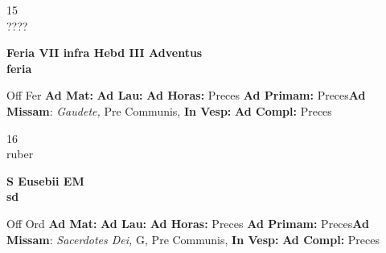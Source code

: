 \documentclass[10pt, openany]{book}
\begin{document}
    \begin{center}
        \begin{minipage}{3.5in}
            \vspace{2em}
            \begin{minipage}{0.5in}
                {\Huge 15} \\
                {\normalsize ????}
            \end{minipage}
            \begin{minipage}{3.0in}
                \textbf{ \large Feria VII infra Hebd III Adventus \\
                \textnormal{\normalsize feria}}

            \end{minipage}
            \begin{justify}Off Fer
                \textbf{Ad Mat: }
                \textbf{Ad Lau: }
                \textbf{Ad Horas: }Preces
                \textbf{Ad Primam: }Preces\textbf{Ad Missam}: \textit{Gaudete,} Pre Communis, 
                \textbf{In Vesp: }
                \textbf{Ad Compl: }Preces
            \end{justify}
        \end{minipage}
    \end{center}

    \begin{center}
        \begin{minipage}{3.5in}
            \vspace{2em}
            \begin{minipage}{0.5in}
                {\Huge 16} \\
                {\normalsize ruber}
            \end{minipage}
            \begin{minipage}{3.0in}
                \textbf{ \large S Eusebii EM \\
                \textnormal{\normalsize sd}}

            \end{minipage}
            \begin{justify}Off Ord
                \textbf{Ad Mat: }
                \textbf{Ad Lau: }
                \textbf{Ad Horas: }Preces
                \textbf{Ad Primam: }Preces\textbf{Ad Missam}: \textit{Sacerdotes Dei,} G, Pre Communis, 
                \textbf{In Vesp: }
                \textbf{Ad Compl: }Preces
            \end{justify}
        \end{minipage}
    \end{center}
\end{document}
